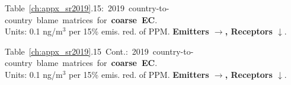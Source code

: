 \footnotesize{\mbox{Table \ref{ch:appx_sr2019}.15: 2019
    country-to-country blame matrices for \textbf{coarse
      EC}.}\\ Units: 0.1 ng/m$^3$ per 15\% emis. red. of PPM. \textbf{Emitters $\rightarrow$, Receptors $\downarrow$}. }\\[\baselineskip]\enlargethispage{\myenlarge} \hspace{-0.5cm} 
\centerline{}\clearpage
\footnotesize{\mbox{Table \ref{ch:appx_sr2019}.15 Cont.: 2019
    country-to-country blame matrices for \textbf{coarse
      EC}.}\\ Units: 0.1 ng/m$^3$ per 15\% emis. red. of PPM. \textbf{Emitters $\rightarrow$, Receptors $\downarrow$}. }\\[\baselineskip]\enlargethispage{\myenlarge} \hspace{-0.5cm} 
\centerline{}\clearpage



